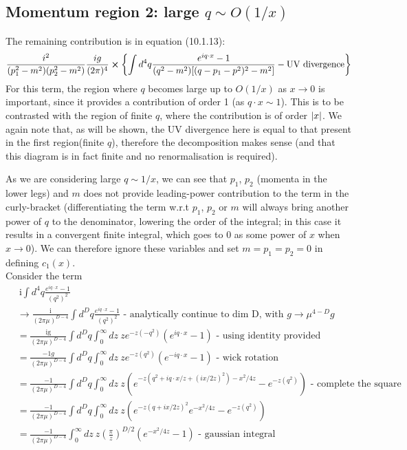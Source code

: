 \documentclass{article}
\begin{document}
\subsection{Momentum region 2: large $q \sim O(1/x)$}\label{large q}
The remaining contribution is in equation (10.1.13):
\begin{equation} \label{eq:div_eg_large_q}
    \frac{i^2}{(p_1^2-m^2)(p_2^2-m^2)}\frac{ig}{(2\pi)^4}\cross\qty{\int d^4q \frac{e^{iq\cdot x}-1}{(q^2-m^2)[(q-p_1-p^2)^2-m^2]}-\text{UV divergence}}
\end{equation}
For this term, the region where $q$ becomes large up to $O(1/x)$ as $x \rightarrow 0$ is important, since it provides a contribution of order 1 (as $q\cdot x \sim 1$). This is to be contrasted with the region of finite $q$, where the contribution is of order $\abs{x}$. We again note that, as will be shown, the UV divergence here is equal to that present in the first region(finite $q$), therefore the decomposition makes sense (and that this diagram is in fact finite and no renormalisation is required).

As we are considering large $q \sim 1/x$, we can see that $p_1$, $p_2$ (momenta in the lower legs) and $m$ does not provide leading-power contribution to the term in the curly-bracket (differentiating the term w.r.t $p_1$, $p_2$ or $m$ will always bring another power of $q$ to the denominator, lowering the order of the integral; in this case it results in a convergent finite integral, which goes to $0$ as some power of $x$ when $x \rightarrow 0$). We can therefore ignore these variables and set $m=p_1=p_2=0$ in defining $c_1(x)$. \\

Consider the term
\begin{equation}
\begin{split}
    &\ \text{i}\int d^4q\frac{e^{iq\cdot x}-1}{(q^2)^2} \\
    &\rightarrow\frac{\text{i}}{(2\pi\mu)^{D-4}}\int d^Dq\frac{e^{iq\cdot x}-1}{(q^2)^2} \text{ - analytically continue to dim D, with } g \rightarrow \mu^{4-D}g\\
    &= \frac{\text{ig}}{(2\pi\mu)^{D-4}}\int d^Dq \int_0^\infty  dz\ z e^{-z(-q^2)} (e^{iq\cdot x}-1) \text{ - using identity provided}\\
    &= \frac{-1g}{(2\pi\mu)^{D-4}}\int d^Dq \int_0^\infty  dz\ z e^{-z(q^2)} (e^{-iq\cdot x}-1) \text{ - wick rotation}\\
    &= \frac{-1}{(2\pi\mu)^{D-4}}\int d^Dq \int_0^\infty  dz\ z (e^{-z(q^2+iq\cdot x/z+(ix/2z)^2)-x^2/4z}-e^{-z(q^2)}) \text{ - complete the square}\\
    &= \frac{-1}{(2\pi\mu)^{D-4}}\int d^Dq \int_0^\infty  dz\ z (e^{-z(q+ix/2z)^2}e^{-x^2/4z}-e^{-z(q^2)})\\
    &= \frac{-1}{(2\pi\mu)^{D-4}}\int_0^\infty  dz\ z (\frac{\pi}{z})^{D/2}(e^{-x^2/4z}-1)\text{ - gaussian integral}\\
\end{split}
\end{equation}
\end{document}
